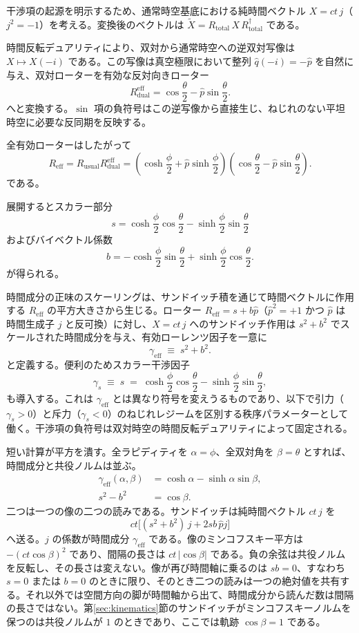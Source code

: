 \documentclass[a4paper]{article}
\begin{document}
干渉項の起源を明示するため、通常時空基底における純時間ベクトル $X = ct \, j$（$j^2 = -1$）を考える。変換後のベクトルは $\tilde{X} = R_\text{total} \, X \, R_\text{total}^\dagger$ である。

時間反転デュアリティにより、双対から通常時空への逆双対写像は $X \mapsto X(-i)$ である。この写像は真空極限において整列 $\hat{q} (-i) = -\hat{p}$ を自然に与え、双対ローターを有効な反対向きローター
\[
R_\text{dual}^\text{eff} = \cos\frac{\theta}{2} - \hat{p} \sin\frac{\theta}{2}.
\]
へと変換する。$\sin$ 項の負符号はこの逆写像から直接生じ、ねじれのない平坦時空に必要な反同期を反映する。

全有効ローターはしたがって
\[
R_\text{eff} = R_\text{usual} R_\text{dual}^\text{eff} = \left( \cosh\frac{\phi}{2} + \hat{p} \sinh\frac{\phi}{2} \right) \left( \cos\frac{\theta}{2} - \hat{p} \sin\frac{\theta}{2} \right).
\]
である。

展開するとスカラー部分
\[
s = \cosh\frac{\phi}{2} \cos\frac{\theta}{2} - \sinh\frac{\phi}{2} \sin\frac{\theta}{2}
\]
およびバイベクトル係数
\[
b = -\cosh\frac{\phi}{2} \sin\frac{\theta}{2} + \sinh\frac{\phi}{2} \cos\frac{\theta}{2}.
\]
が得られる。

時間成分の正味のスケーリングは、サンドイッチ積を通じて時間ベクトルに作用する $R_\text{eff}$ の平方大きさから生じる。ローター $R_\text{eff} = s + b\hat{p}$（$\hat{p}^2 = +1$ かつ $\hat{p}$ は時間生成子 $j$ と反可換）に対し、$X = ct\, j$ へのサンドイッチ作用は $s^2 + b^2$ でスケールされた時間成分を与え、有効ローレンツ因子を一意に
\[
\gamma_\text{eff} \;\equiv\; s^2 + b^2.
\]
と定義する。便利のためスカラー干渉因子
\[
\gamma_s \;\equiv\; s \;=\; \cosh\frac{\phi}{2} \cos\frac{\theta}{2} - \sinh\frac{\phi}{2} \sin\frac{\theta}{2},
\]
も導入する。これは $\gamma_\text{eff}$ とは異なり符号を変えうるものであり、以下で引力（$\gamma_s > 0$）と斥力（$\gamma_s < 0$）のねじれレジームを区別する秩序パラメーターとして働く。干渉項の負符号は双対時空の時間反転デュアリティによって固定される。

短い計算が平方を潰す。全ラピディティを $\alpha=\phi$、全双対角を $\beta=\theta$ とすれば、時間成分と共役ノルムは並ぶ。
\begin{align}
\gamma_{\mathrm{eff}}(\alpha,\beta)&=\cosh\alpha-\sinh\alpha\sin\beta,
\label{eq:gamma-eff}\\
s^{2}-b^{2}&=\cos\beta.
\label{eq:gamma-cos}
\end{align}
二つは一つの像の二つの読みである。サンドイッチは純時間ベクトル $ct\,j$ を
\[
ct\bigl[(s^{2}+b^{2})\,j+2sb\,\hat{p}j\bigr]
\]
へ送る。$j$ の係数が時間成分 $\gamma_{\mathrm{eff}}$ である。像のミンコフスキー平方は $-(ct\cos\beta)^{2}$ であり、間隔の長さは $ct\,|\cos\beta|$ である。負の余弦は共役ノルムを反転し、その長さは変えない。像が再び時間軸に乗るのは $sb=0$、すなわち $s=0$ または $b=0$ のときに限り、そのとき二つの読みは一つの絶対値を共有する。それ以外では空間方向の脚が時間軸から出て、時間成分から読んだ数は間隔の長さではない。第\ref{sec:kinematics}節のサンドイッチがミンコフスキーノルムを保つのは共役ノルムが $1$ のときであり、ここでは軌跡 $\cos\beta=1$ である。
\end{document}
